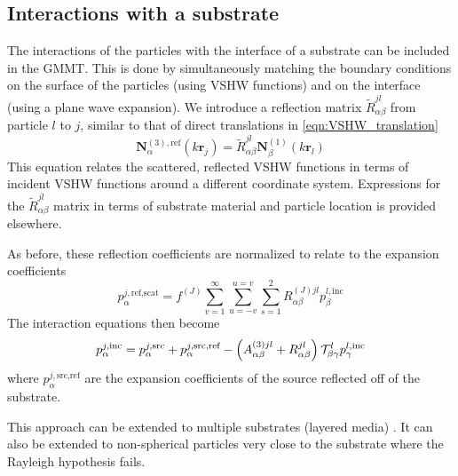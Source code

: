 \documentclass[11pt]{article}
\begin{document}
\subsection{Interactions with a substrate}
The interactions of the particles with the interface of a substrate can be included in the GMMT.
This is done by simultaneously matching the boundary conditions on the surface of the particles (using VSHW functions) and on the interface (using a plane wave expansion). \cite{mackowski2008exact}
We introduce a reflection matrix $\widetilde{R}_{\alpha\beta}^{jl}$ from particle $l$ to $j$, similar to that of direct translations in \cref{eqn:VSHW_translation}
\begin{equation}
    \bm{N}_{\alpha}^{(3),\text{ref}}(k\bm{r}_j) = 
    \widetilde{R}_{\alpha\beta}^{jl} \bm{N}_{\beta}^{(1)}(k\bm{r}_l)
    \label{eqn:VSHW_reflection_translation}
\end{equation}
This equation relates the scattered, reflected VSHW functions in terms of incident VSHW functions around a different coordinate system.
Expressions for the $\widetilde{R}_{\alpha\beta}^{jl}$ matrix in terms of substrate material and particle location is provided elsewhere. \cite{mackowski2008exact}

As before, these reflection coefficients are normalized to relate to the expansion coefficients
\begin{equation}
    p_{\alpha}^{j,\text{ref,scat}} = f^{(J)}\sum_{v=1}^\infty \sum_{u=-v}^{u=v} \sum_{s=1}^2
    R_{\alpha\beta}^{(J)jl} p_{\beta}^{l,\text{inc}}
    \label{eqn:VSHW_reflection_translation_normalized}
\end{equation}
The interaction equations then become
\begin{equation}
    p_{\alpha}^{j,\text{inc}}= 
    p_{\alpha}^{j,\text{src}} + p_{\alpha}^{j,\text{src,ref}}  -
    \left( A_{\alpha \beta}^{(3)jl} + R_{\alpha \beta}^{jl} \right)
    \mathcal{T}_{\beta \gamma}^l
    p_{\gamma}^{l,\text{inc}}
\label{eqn:particle_interactions_substrate}
\end{equation}
where $p_{\alpha}^{j,\text{src,ref}}$ are the expansion coefficients of the source reflected off of the substrate.

This approach can be extended to multiple substrates (layered media) \cite{egel2014dipole}.
It can also be extended to non-spherical particles very close to the substrate where the Rayleigh hypothesis fails. \cite{egel2016light}
\end{document}
